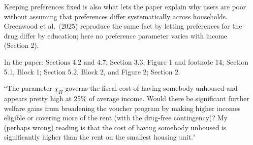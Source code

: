 \documentclass[11pt]{article}
\begin{document}
\begin{response}
Keeping preferences fixed is also what lets the paper explain why users are poor without
assuming that preferences differ systematically across households. Greenwood et al.\
(2025) reproduce the same fact by letting preferences for the drug differ by education;
here no preference parameter varies with income (Section 2).

In the paper: Sections 4.2 and 4.7; Section 3.3, Figure 1 and footnote 14; Section 5.1,
Block 1; Section 5.2, Block 2, and Figure 2; Section 2.
\end{response}

\begin{referee}
``The parameter $\chi_H$ governs the fiscal cost of having somebody unhoused and
appears pretty high at 25\% of average income. Would there be significant further
welfare gains from broadening the voucher program by making higher incomes
eligible or covering more of the rent (with the drug-free contingency)? My
(perhaps wrong) reading is that the cost of having somebody unhoused is
significantly higher than the rent on the smallest housing unit.''
\end{referee}
\end{document}
